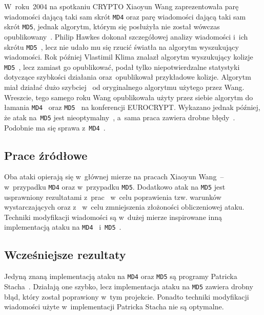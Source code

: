\documentclass[12pt,a4paper,twoside]{article}
\begin{document}
W~roku~2004 na spotkaniu CRYPTO Xiaoyun Wang zaprezentowała parę wiadomości
dającą taki sam skrót \texttt{MD4} oraz parę wiadomości dającą taki sam skrót
\texttt{MD5}, jednak algorytm, którym się posłużyła nie został wówczas
opublikowany~\cite{wang2004finding}. Philip Hawkes dokonał szczegółowej analizy
wiadomości i~ich skrótu \texttt{MD5}~\cite{hawkes2004musings}, lecz nie udało
mu się rzucić światła na algorytm wyszukujący wiadomości. Rok później Vlastimil
Klima znalazł algorytm wyszukujący kolizje
\texttt{MD5}~\cite{klima2005finding1}, lecz zamiast go opublikować, podał tylko
niepotwierdzalne statystyki dotyczące szybkości działania oraz~opublikował
przykładowe kolizje. Algorytm miał działać dużo
szybciej~\cite{klima2006tunnels} od oryginalnego algorytmu użytego przez Wang.
Wreszcie, tego samego roku Wang opublikowała użyty przez siebie algorytm do
łamania \texttt{MD4}~\cite{wang2005md4} oraz \texttt{MD5}~\cite{wang2005md5} na
konferencji EUROCRYPT. Wykazano jednak później, że atak na~\texttt{MD5} jest
nieoptymalny~\cite{klima2005finding2,klima2006tunnels}, a~sama praca zawiera
drobne błędy~\cite{yajima2005wang,sasaki2005improved,liang2007improved}.
Podobnie ma się sprawa z~\texttt{MD4}~\cite{naito2005improved}.

\subsection{Prace źródłowe}

Oba ataki opierają się w~głównej mierze na pracach Xiaoyun Wang~--
\cite{wang2005md4} w~przypadku \texttt{MD4} oraz \cite{wang2005md5} w~przypadku
\texttt{MD5}. Dodatkowo atak na \texttt{MD5} jest usprawniony rezultatami
z~prac~\cite{yajima2005wang,sasaki2005improved,liang2007improved} w~celu
poprawienia tzw. warunków wystarczających oraz z~\cite{klima2005finding2} w~celu
zmniejszenia złożoności obliczeniowej ataku. Techniki modyfikacji wiadomości są
w~dużej mierze inspirowane inną implementacją ataku na
\texttt{MD4}~\cite{stach2005md4} i~\texttt{MD5}~\cite{stach2005md5}.

\subsection{Wcześniejsze rezultaty}

Jedyną znaną implementacją ataku na \texttt{MD4} oraz \texttt{MD5} są programy
Patricka Stacha~\cite{stach2005md4,stach2005md5}. Działają one szybko, lecz
implementacja ataku na \texttt{MD5} zawiera drobny błąd, który został
poprawiony w~tym projekcie. Ponadto techniki modyfikacji wiadomości użyte
w~implementacji Patricka Stacha nie są optymalne.
\end{document}
